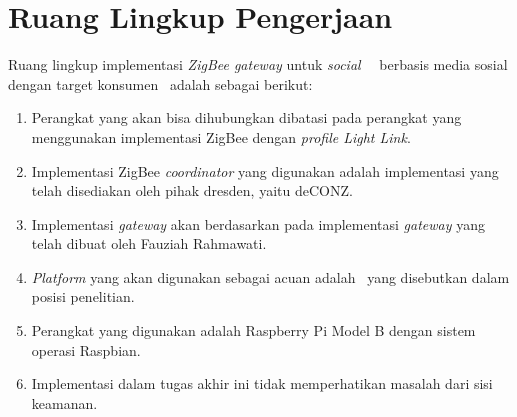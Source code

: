 \section{Ruang Lingkup Pengerjaan}
Ruang lingkup implementasi \textit{ZigBee gateway} untuk \textit{social} \iot~\plat~berbasis media sosial dengan target konsumen \eu~adalah sebagai berikut:
\begin{enumerate}
	\item Perangkat yang akan bisa dihubungkan dibatasi pada perangkat yang menggunakan implementasi ZigBee dengan \textit{profile Light Link}.
	\item Implementasi ZigBee \textit{coordinator} yang digunakan adalah implementasi yang telah disediakan oleh pihak dresden, yaitu deCONZ.
	\item Implementasi \textit{gateway} akan berdasarkan pada implementasi \textit{gateway} yang telah dibuat oleh Fauziah Rahmawati\cite{SkripsiFarah}.
	\item \textit{Platform} yang akan digunakan sebagai acuan adalah \plat~yang disebutkan dalam posisi penelitian.
	\item Perangkat yang digunakan adalah Raspberry Pi Model B dengan sistem operasi Raspbian.
	\item Implementasi dalam tugas akhir ini tidak memperhatikan masalah dari sisi keamanan.
\end{enumerate}

